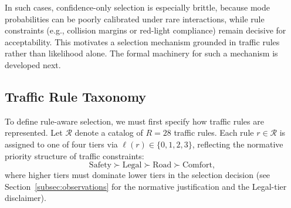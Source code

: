 In such cases, confidence-only selection is especially brittle, because mode probabilities can be poorly calibrated under rare interactions, while rule constraints (e.g., collision margins or red-light compliance) remain decisive for acceptability.  This motivates a selection mechanism grounded in traffic rules rather than likelihood alone.
The formal machinery for such a mechanism is developed next.

\subsection{Traffic Rule Taxonomy}
\label{subsec:rule_taxonomy}

To define rule-aware selection, we must first specify how traffic rules are represented.  Let $\mathcal{R}$ denote a catalog of $R{=}28$ traffic rules. Each rule $r \in \mathcal{R}$ is assigned to one of four tiers via $\ell(r)\in\{0,1,2,3\}$, reflecting the normative priority structure of
traffic constraints:
\begin{equation}
\text{Safety} \succ \text{Legal} \succ \text{Road} \succ \text{Comfort},
\end{equation}
where higher tiers must dominate lower tiers in the selection decision (see Section~\ref{subsec:observations} for the normative justification and the Legal-tier disclaimer).

